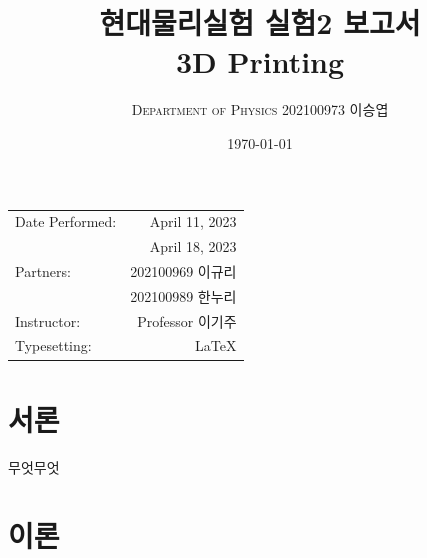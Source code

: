 \documentclass[a4paper, 10pt, nanum]{CSUniSchoolLabReport}
\title{현대물리실험 실험2 보고서 \\ 3D Printing} %
\author{\textsc{Department of Physics} 202100973 이승엽}
\date{\today}
\begin{document}
\maketitle %

\begin{center}
	\begin{tabular}{l r}
		Date Performed: & April 11, 2023 \\ %
		& April 18, 2023 \\
		Partners: & 202100969 이규리 \\ %
		& 202100989 한누리 \\
		Instructor: & Professor 이기주 \\ %
		Typesetting: & LaTeX \\
	\end{tabular}
\end{center}


\maketitle


\section{서론}

	무엇무엇


\section{이론}
\end{document}
